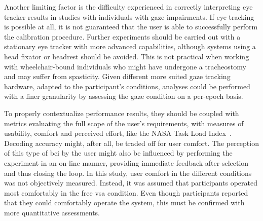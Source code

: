 \documentclass{article}
\begin{document}
Another limiting factor is the difficulty experienced in correctly interpreting eye
tracker results in studies with individuals with gaze impairments.
If eye tracking is possible at all, it is not guaranteed that the user is able
to successfully perform the calibration procedure.
Further experiments should be carried out with a stationary eye tracker with
more advanced capabilities, although systems using a head fixator or headrest
should be avoided.
This is not practical when working with
wheelchair-bound individuals who might have undergone a tracheostomy and may
suffer from spasticity.
Given different more suited gaze tracking hardware, adapted to the participant's
conditions, analyses could be performed with a finer granularity by assessing
the gaze condition on a per-epoch basis.

To properly contextualize performance results, they should be coupled with
metrics evaluating the full scope of the user's requirements, with measures of
usability, comfort and perceived effort, like the NASA Task Load
Index~\cite{Hart2006}.
Decoding accuracy might, after all, be traded off for user comfort.
The perception of this type of \ac{bci} by the user might also be influenced by
performing the experiment in an on-line manner, providing immediate feedback
after selection and thus closing the loop.
In this study, user comfort in the different conditions was not objectively
measured.
Instead, it was assumed that participants operated most comfortably in the free
\ac{vsa} condition.
Even though participants reported that they could comfortably operate the
system, this must be confirmed with more quantitative assessments.

\end{document}

